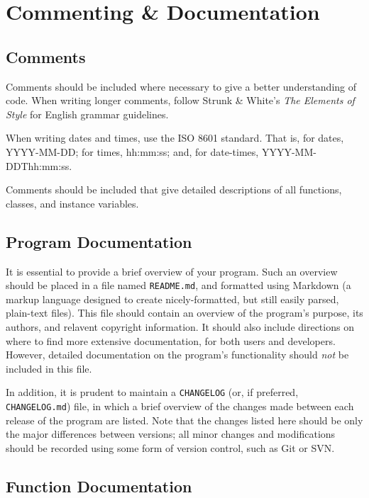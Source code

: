 \documentclass[StyleGuide.tex]{subfiles}
\begin{document}
\chapter{Commenting \& Documentation}\label{commenting-documentation}

\section{Comments}\label{comments}

Comments should be included where necessary to give a better
understanding of code. When writing longer comments, follow Strunk \&
White's \emph{The Elements of Style} for English grammar guidelines.

When writing dates and times, use the ISO 8601 standard. That is, for
dates, YYYY-MM-DD; for times, hh:mm:ss; and, for date-times,
YYYY-MM-DDThh:mm:ss.

Comments should be included that give detailed descriptions of all
functions, classes, and instance variables.

\section{Program Documentation}\label{program-documentation}

It is essential to provide a brief overview of your program. Such an
overview should be placed in a file named \texttt{README.md}, and
formatted using Markdown (a markup language designed to create
nicely-formatted, but still easily parsed, plain-text files). This file
should contain an overview of the program's purpose, its authors, and
relavent copyright information. It should also include directions on
where to find more extensive documentation, for both users and
developers. However, detailed documentation on the program's
functionality should \emph{not} be included in this file.

In addition, it is prudent to maintain a \texttt{CHANGELOG} (or, if
preferred, \texttt{CHANGELOG.md}) file, in which a brief overview of the
changes made between each release of the program are listed. Note that
the changes listed here should be only the major differences between
versions; all minor changes and modifications should be recorded using
some form of version control, such as Git or SVN.

\section{Function Documentation}\label{function-documentation}
\end{document}
